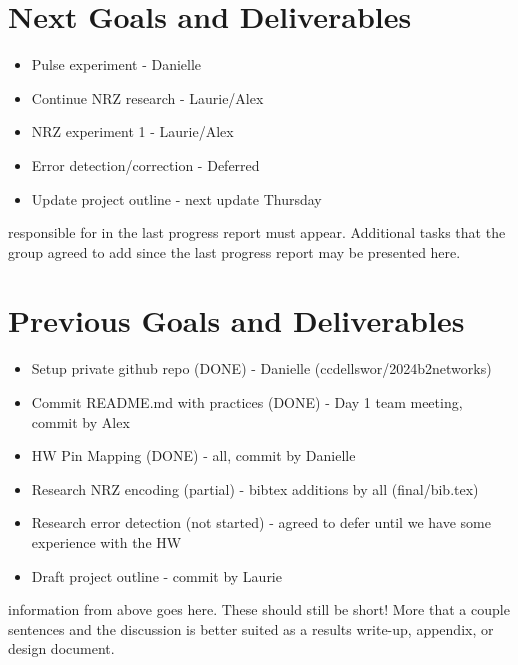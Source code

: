 \documentclass{article}
\begin{document}
\section*{Next Goals and Deliverables}
\begin{itemize}
\item Pulse experiment - Danielle
\item Continue NRZ research - Laurie/Alex
\item NRZ experiment 1 - Laurie/Alex
\item Error detection/correction - Deferred
\item Update project outline - next update Thursday
\end{itemize}

responsible for in the last progress report must appear. Additional tasks that the
group agreed to add since the last progress report may be presented here.
\section*{Previous Goals and Deliverables}
\begin{itemize}
\item Setup private github repo (DONE) - Danielle (ccdellswor/2024b2networks)
\item Commit README.md with practices (DONE) - Day 1 team meeting, commit by Alex
\item HW Pin Mapping (DONE) - all, commit by Danielle
\item Research NRZ encoding (partial) - bibtex additions by all (final/bib.tex)
\item Research error detection (not started) - agreed to defer until we have some
experience with the HW
\item Draft project outline - commit by Laurie
\end{itemize}

information from above goes here. These should still be short! More that a couple
sentences and the discussion is better suited as a results write-up, appendix, or
design document.
\end{document}
